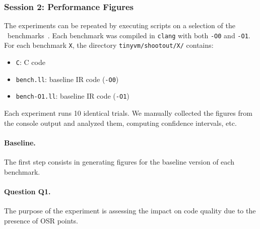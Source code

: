 \subsubsection{Session 2: Performance Figures}

The experiments can be repeated by executing scripts on a selection of the \shootout\ benchmarks~\cite{shootout}. Each benchmark was compiled in {\tt clang} with both {\tt -O0} and {\tt -O1}. For each benchmark {\tt X}, the directory {\tt tinyvm/shootout/X/} contains:

\begin{itemize}[parsep=0pt]
\item {\tt C}: C code
\item {\tt bench.ll}: baseline IR code ({\tt -O0})
\item {\tt bench-O1.ll}: baseline IR code ({\tt -O1})
\end{itemize}

\noindent Each experiment runs 10 identical trials. We manually collected the figures from the console output and analyzed them, computing confidence intervals, etc. 

\paragraph{Baseline.} The first step consists in generating figures for the baseline version of each benchmark.

\paragraph{Question Q1.} The purpose of the experiment is assessing the impact on code quality due to the presence of OSR points.






